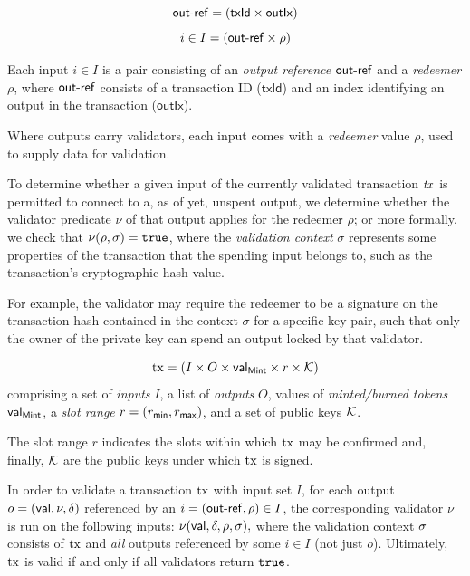 \begin{definition}[Inputs]
$$\mathsf{out\textsf{-}{}ref} = (\mathsf{txId} \times \mathsf{outIx})$$
$$i \in I = (\mathsf{out\textsf{-}{}ref} \times \rho)$$

Each input \(i\in I\) is a pair consisting of an \emph{output reference} $\mathsf{out\textsf{-}{}ref}$ and a \emph{redeemer} $\rho$, where $\mathsf{out\textsf{-}{}ref}$ consists of a transaction ID ($\mathsf{txId}$) and an index identifying an output in the transaction ($\mathsf{outIx}$).
\end{definition}

\begin{definition}[Redeemer]
Where outputs carry validators, each input comes with a \emph{redeemer} value $\rho$, used to supply data for validation. 

To determine whether a given input of the currently validated transaction $\mathit{tx}$ is permitted to connect to a, as of yet, unspent output, we determine whether the validator predicate $\nu$ of that output applies for the redeemer $\rho$; or more formally, we check that \(\nu(\rho, \sigma) = \mathtt{true}\), where the \emph{validation context} $\sigma$ represents some properties of the transaction that the spending input belongs to, such as the transaction's cryptographic hash value. 

For example, the validator may require the redeemer to be a signature on the transaction hash contained in the context $\sigma$ for a specific key pair, such that only the owner of the private key can spend an output locked by that validator.
\end{definition}

\begin{definition}[Transactions]
$$
\mathrm{tx} = (I \times O \times \mathsf{val}_\mathsf{Mint} \times r \times \mathcal K)
$$ 
comprising a set of
\emph{inputs} $I$, a list of \emph{outputs} $O$, values of
\emph{minted/burned tokens} $\mathsf{val}_\mathsf{Mint}$, a \emph{slot range}
\(r = (r_{\mathsf{min}}, r_{\mathsf{max}})\), and a set of public keys $\mathcal K$.

The slot range $r$ indicates the slots within which $\mathrm{tx}$ may be
confirmed and, finally, $\mathcal K$ are the public keys under which
$\mathrm{tx}$ is signed.

In order to validate a transaction $\mathrm{tx}$ with input set $I$, for each
output $o = (\mathsf{val},\nu,\delta)$ referenced by an
$i = (\mathsf{out\textsf{-}{}ref},\rho) \in I$, the corresponding validator $\nu$ is run
on the following inputs:
\(
  \nu(\mathsf{val},\delta,\rho,\sigma),
\)
where the validation context $\sigma$ consists of $\mathrm{tx}$ and \emph{all} outputs
referenced by some $i \in I$ (not just $o$). Ultimately, $\mathrm{tx}$ is
valid if and only if all validators return $\mathtt{true}$.
\end{definition}

